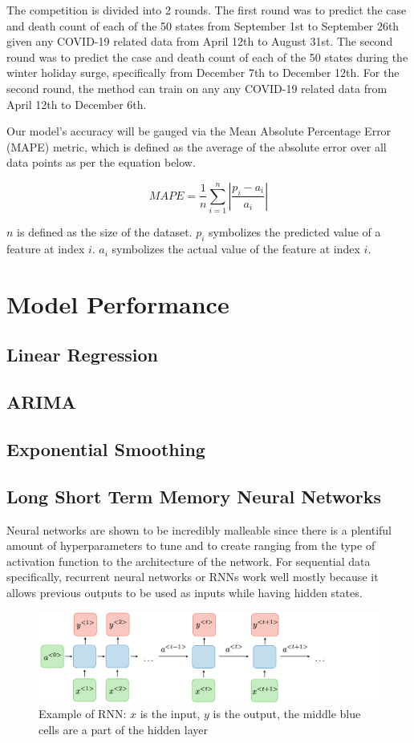 \documentclass[sigconf,nonacm]{acmart}
\begin{document}
The competition is divided into 2 rounds. The first round was to predict the
case and death count of each of the 50 states from September 1st to September
26th given any COVID-19 related data from April 12th to August 31st. The second
round was to predict the case and death count of each of the 50 states during
the winter holiday surge, specifically from December 7th to December 12th. 
For
the second round, the method can train on any any COVID-19 related data from
April 12th to December 6th. 

Our model's accuracy will be gauged via the Mean Absolute Percentage Error
(MAPE) metric, which is defined as the average of the absolute error over all
data points as per the equation below. 

$$MAPE = \frac{1}{n} \sum_{i = 1}^{n} |\frac{p_i - a_i}{a_i} |$$

$n$ is defined as the size of the dataset. $p_i$ symbolizes the predicted value
of a feature at index $i$. $a_i$ symbolizes the actual value of the feature at
index $i$.


\section{Model Performance}
\subsection{Linear Regression}
\subsection{ARIMA}
\subsection{Exponential Smoothing}
\subsection{Long Short Term Memory Neural Networks}

Neural networks are shown to be incredibly malleable since there is a plentiful
amount of hyperparameters to tune and to create ranging from the type of
activation function to the architecture of the network. For sequential data
specifically, recurrent neural networks or RNNs work well mostly because it
allows previous outputs to be used as inputs while having hidden states. 

\begin{figure}
  \centering
  \includegraphics[width=\linewidth]{figures/architecture-rnn-ltr.png}
  \caption{Example of RNN: $x$ is the input, $y$ is the output, the middle blue
  cells are a part of the hidden layer}
  \label{fig:rnn}
\end{figure}
\end{document}
